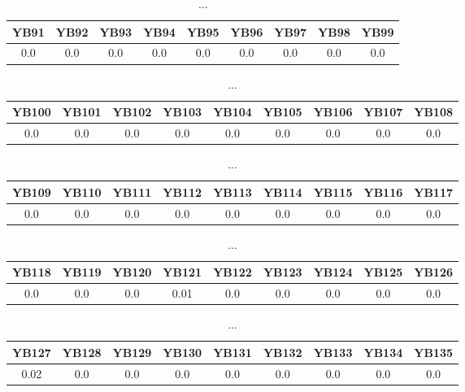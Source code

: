 \documentclass[]{article}
\begin{document}
\begin{table}[h]
	\centering
	\begin{tabular}{|c|c|c|c|c|c|c|c|c|}
		\hline
		YB91 & YB92 & YB93 & YB94 & YB95 & YB96 & YB97 & YB98 & YB99 \\
		\hline
		0.0  & 0.0  & 0.0  & 0.0  & 0.0  & 0.0  & 0.0  & 0.0  & 0.0  \\
		\hline
	\end{tabular}
	\caption{...}
\end{table}
\begin{table}[h]
	\centering
	\begin{tabular}{|c|c|c|c|c|c|c|c|c|}
		\hline
		YB100 & YB101 & YB102 & YB103 & YB104 & YB105 & YB106 & YB107 & YB108 \\
		\hline
		0.0   & 0.0   & 0.0   & 0.0   & 0.0   & 0.0   & 0.0   & 0.0   & 0.0   \\
		\hline
	\end{tabular}
	\caption{...}
\end{table}
\begin{table}[h]
	\centering
	\begin{tabular}{|c|c|c|c|c|c|c|c|c|}
		\hline
		YB109 & YB110 & YB111 & YB112 & YB113 & YB114 & YB115 & YB116 & YB117 \\
		\hline
		0.0   & 0.0   & 0.0   & 0.0   & 0.0   & 0.0   & 0.0   & 0.0   & 0.0   \\
		\hline
	\end{tabular}
	\caption{...}
\end{table}
\begin{table}[h]
	\centering
	\begin{tabular}{|c|c|c|c|c|c|c|c|c|}
		\hline
		YB118 & YB119 & YB120 & YB121 & YB122 & YB123 & YB124 & YB125 & YB126 \\
		\hline
		0.0   & 0.0   & 0.0   & 0.01  & 0.0   & 0.0   & 0.0   & 0.0   & 0.0   \\
		\hline
	\end{tabular}
	\caption{...}
\end{table}
\begin{table}[h]
	\centering
	\begin{tabular}{|c|c|c|c|c|c|c|c|c|}
		\hline
		YB127 & YB128 & YB129 & YB130 & YB131 & YB132 & YB133 & YB134 & YB135 \\
		\hline
		0.02  & 0.0   & 0.0   & 0.0   & 0.0   & 0.0   & 0.0   & 0.0   & 0.0   \\
		\hline
	\end{tabular}
	\caption{...}
\end{table}
\end{document}
